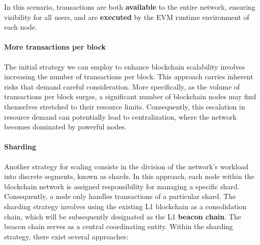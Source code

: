 In this scenario, transactions are both \textbf{available} to the entire network, ensuring visibility for all users, and are \textbf{executed} by the EVM runtime environment of each node.

\paragraph*{More transactions per block}

The initial strategy we can employ to enhance blockchain scalability involves increasing the number of transactions per block. This approach carries inherent risks that demand careful consideration. More specifically, as the volume of transactions per block surges, a significant number of blockchain nodes may find themselves stretched to their resource limits. Consequently, this escalation in resource demand can potentially lead to centralization, where the network becomes dominated by powerful nodes.

\paragraph*{Sharding}

Another strategy for scaling consists in the division of the network's workload into discrete segments, known as shards. In this approach, each node within the blockchain network is assigned responsibility for managing a specific shard. Consequently, a node only handles transactions of a particular shard. The sharding strategy involves using the existing L1 blockchain as a consolidation chain, which will be subsequently designated as the L1 \textbf{beacon chain}. The beacon chain serves as a central coordinating entity. Within the sharding strategy, there exist several approaches:

